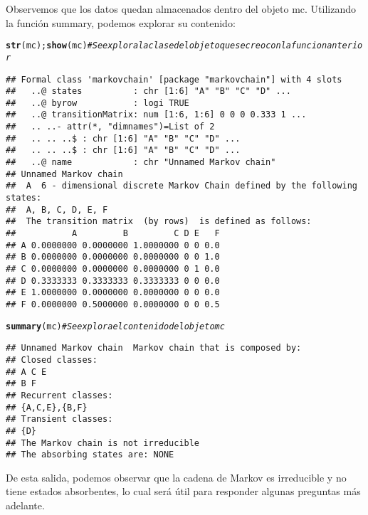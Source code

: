 \documentclass[11pt]{article}\usepackage[]{graphicx}\usepackage[table]{xcolor}
\makeatletter
\newcommand{\hlcom}[1]{\textcolor[rgb]{0.678,0.584,0.686}{\textit{#1}}}%
\newcommand{\hlstd}[1]{\textcolor[rgb]{0.345,0.345,0.345}{#1}}%
\newcommand{\hlkwd}[1]{\textcolor[rgb]{0.737,0.353,0.396}{\textbf{#1}}}%
\newenvironment{kframe}{%
 \def\at@end@of@kframe{}%
 \ifinner\ifhmode%
  \def\at@end@of@kframe{\end{minipage}}%
  \begin{minipage}{\columnwidth}%
 \fi\fi%
 \def\FrameCommand##1{\hskip\@totalleftmargin \hskip-\fboxsep
 \colorbox{shadecolor}{##1}\hskip-\fboxsep
     \hskip-\linewidth \hskip-\@totalleftmargin \hskip\columnwidth}%
 \MakeFramed {\advance\hsize-\width
   \@totalleftmargin\z@ \linewidth\hsize
   \@setminipage}}%
 {\par\unskip\endMakeFramed%
 \at@end@of@kframe}
\newenvironment{knitrout}{}{} %
\makeatother
\begin{document}
Observemos que los datos quedan almacenados dentro del objeto mc. Utilizando la función summary, podemos explorar su contenido:

\begin{knitrout}
\color{fgcolor}\begin{kframe}
\begin{alltt}
\hlkwd{str}\hlstd{(mc);}\hlkwd{show}\hlstd{(mc)} \hlcom{#Se explora la clase del objeto que se creo con la funcion anterior}
\end{alltt}
\begin{verbatim}
## Formal class 'markovchain' [package "markovchain"] with 4 slots
##   ..@ states          : chr [1:6] "A" "B" "C" "D" ...
##   ..@ byrow           : logi TRUE
##   ..@ transitionMatrix: num [1:6, 1:6] 0 0 0 0.333 1 ...
##   .. ..- attr(*, "dimnames")=List of 2
##   .. .. ..$ : chr [1:6] "A" "B" "C" "D" ...
##   .. .. ..$ : chr [1:6] "A" "B" "C" "D" ...
##   ..@ name            : chr "Unnamed Markov chain"
## Unnamed Markov chain 
##  A  6 - dimensional discrete Markov Chain defined by the following states: 
##  A, B, C, D, E, F 
##  The transition matrix  (by rows)  is defined as follows: 
##           A         B         C D E   F
## A 0.0000000 0.0000000 1.0000000 0 0 0.0
## B 0.0000000 0.0000000 0.0000000 0 0 1.0
## C 0.0000000 0.0000000 0.0000000 0 1 0.0
## D 0.3333333 0.3333333 0.3333333 0 0 0.0
## E 1.0000000 0.0000000 0.0000000 0 0 0.0
## F 0.0000000 0.5000000 0.0000000 0 0 0.5
\end{verbatim}
\begin{alltt}
\hlkwd{summary}\hlstd{(mc)} \hlcom{# Se explora el contenido del objeto mc }
\end{alltt}
\begin{verbatim}
## Unnamed Markov chain  Markov chain that is composed by: 
## Closed classes: 
## A C E 
## B F 
## Recurrent classes: 
## {A,C,E},{B,F}
## Transient classes: 
## {D}
## The Markov chain is not irreducible 
## The absorbing states are: NONE
\end{verbatim}
\end{kframe}
\end{knitrout}


De esta salida, podemos observar que la cadena de Markov es irreducible y no tiene estados absorbentes, lo cual será útil para responder algunas preguntas más adelante.
\end{document}
